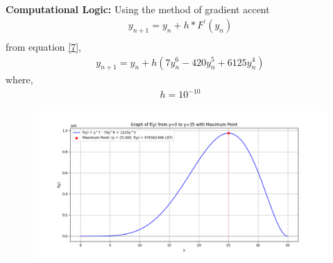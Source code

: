 \documentclass[journal]{IEEEtran}
\begin{document}
\textbf{Computational Logic:} 
Using the method of gradient accent
\begin{align}
    y_{n+1}=y_n+h*F^\prime(y_n) \label{16} \\
\end{align}
from equation \eqref{7},
\begin{align}
    y_{n+1}=y_n+h(7y_n^6-420y_n^5+6125y_n^4)
\end{align}
where,
\begin{align}
    h=10^{-10}
\end{align}
\begin{figure}[h]
    \centering
    \includegraphics[width=\columnwidth]{figs/fig.png}
 \end{figure}
\end{document}
